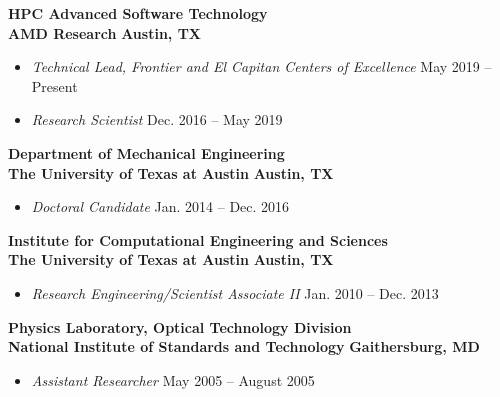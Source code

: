 
\textbf{HPC Advanced Software Technology}\\
\textbf{AMD Research} \hfill \textbf{Austin, TX}
%
\begin{itemize}
\item[] \textit{Technical Lead, Frontier and El Capitan Centers of Excellence} \hfill
	May 2019 -- Present
\item[] \textit{Research Scientist} \hfill
	Dec. 2016 -- May 2019

\end{itemize}

\blankline


\textbf{Department of Mechanical Engineering}\\
\textbf{The University of Texas at Austin} \hfill \textbf{Austin, TX}
%
\begin{itemize}
\item[] \textit{Doctoral Candidate} \hfill
	Jan. 2014 -- Dec. 2016
\end{itemize}

\blankline

\textbf{Institute for Computational Engineering and Sciences}\\
\textbf{The University of Texas at Austin} \hfill \textbf{Austin, TX}
%
\begin{itemize}
\item[] \textit{Research Engineering/Scientist Associate II} \hfill
	Jan. 2010 -- Dec. 2013
\end{itemize}

\blankline

\textbf{Physics Laboratory, Optical Technology Division}\\
\textbf{National Institute of Standards and Technology} \hfill \textbf{Gaithersburg, MD}
%
\begin{itemize}
\item[] \textit{Assistant Researcher} \hfill
	May 2005 -- August 2005
\end{itemize}
